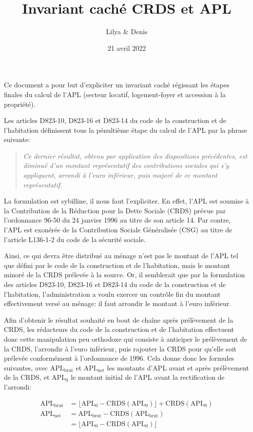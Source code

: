 \documentclass[french,11pt]{article}
\title{Invariant caché CRDS et APL}
\author{Lilya \bsc{Slimani} \& Denis \bsc{Merigoux}}
\date{21 avril 2022}
\begin{document}
\maketitle

Ce document a pour but d'expliciter un invariant caché régissant les étapes finales
du calcul de l'APL (secteur locatif, logement-foyer et accession à la propriété).

Les articles D823-10, D823-16 et D823-14 du code de la construction et de l'habitation
définissent tous la pénultième étape du calcul de l'APL par la phrase suivante:

\begin{quote}
  \itshape Ce dernier résultat, obtenu par application des dispositions précédentes, est diminué d'un montant
  représentatif des contributions sociales qui s'y appliquent, arrondi à l'euro inférieur,
  puis majoré de ce montant représentatif.
\end{quote}

La formulation est sybilline, il nous faut l'expliciter. En effet, l'APL est soumise
à la Contribution de la Réduction pour la Dette Sociale (CRDS) prévue par l'ordonnance
96-50 du 24 janvier 1996 au titre de son article 14. Par contre, l'APL
est exonérée de la Contribution Sociale Généralisée (CSG) au titre de l'article
L136-1-2 du code de la sécurité sociale.

Ainsi, ce qui devra être distribué au ménage n'est pas le montant de l'APL tel que
défini par le code de la construction et de l'habitation, mais le montant minoré
de la CRDS prélevée à la source. Or, il semblerait que par la formulation des articles
D823-10, D823-16 et D823-14 du code de la construction et de l'habitation, l'administration
a voulu exercer un contrôle fin du montant effectivement versé au ménage: il faut
arrondir le montant à l'euro inférieur.

Afin d'obtenir le résultat souhaité en bout de chaîne après prélèvement de la CRDS,
les rédacteurs du code de la construction et de l'habitation effectuent donc cette
manipulation peu orthodoxe qui consiste à anticiper le prélèvement de la CRDS,
l'arrondir à l'euro inférieur, puis rajouter la CRDS pour qu'elle soit prélevée
conformément à l'ordonnance de 1996. Cela donne donc les formules suivantes,
avec $\textrm{APL}_{\text{brut}}$ et $\textrm{APL}_\textrm{net}$ les montants
d'APL avant et après prélèvement de la CRDS, et $\textrm{APL}_0$ le montant
initial de l'APL avant la rectification de l'arrondi:

\begin{align*}
  \textrm{APL}_{\textrm{brut}} & = \lfloor \textrm{APL}_0 - \textrm{CRDS}(\textrm{APL}_0)\rfloor + \textrm{CRDS}(\textrm{APL}_0) \\
  \textrm{APL}_{\textrm{net}}  & = \textrm{APL}_{\textrm{brut}}  - \textrm{CRDS}(\textrm{APL}_{\textrm{brut}} )                  \\
                               & = \lfloor \textrm{APL}_0 - \textrm{CRDS}(\textrm{APL}_0)\rfloor
\end{align*}
\end{document}
